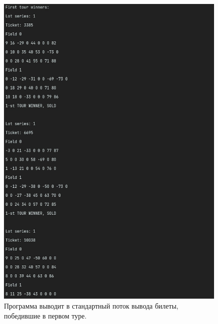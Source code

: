\documentclass[a4paper,14pt]{article}
\begin{document}
\begin{figure}
  \centering
  \includegraphics[width=\linewidth]{pictures/2}
  \caption{Программа выводит в стандартный поток вывода билеты, победившие в первом туре.}
\end{figure}
\end{document}
